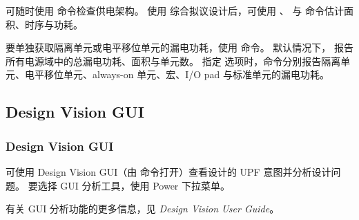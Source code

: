 可随时使用  命令检查供电架构。
使用  综合拟议设计后，可使用 、 与  命令估计面积、时序与功耗。

要单独获取隔离单元或电平移位单元的漏电功耗，使用  命令。
默认情况下， 报告所有电源域中的总漏电功耗、面积与单元数。
指定  选项时，命令分别报告隔离单元、电平移位单元、always-on 单元、宏、I/O pad 与标准单元的漏电功耗。

\subsection{Design Vision GUI}
\subsubsection*{Design Vision GUI}

可使用 Design Vision GUI（由  命令打开）查看设计的 UPF 意图并分析设计问题。
要选择 GUI 分析工具，使用 Power 下拉菜单。

有关 GUI 分析功能的更多信息，见 \textit{Design Vision User Guide}。
